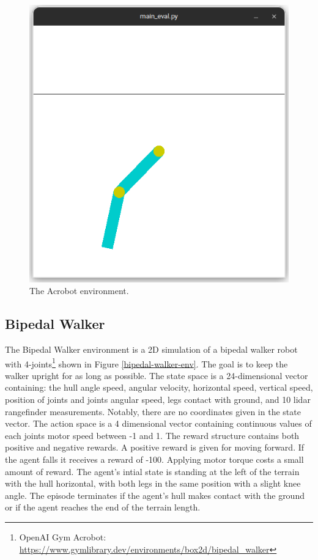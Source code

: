\begin{figure}[htbp]
    \centerline{\includegraphics[width=\columnwidth]{./img/acrobot-env.png}}
    \caption{The Acrobot environment.}
    \label{fig:acrobot-env}
\end{figure}

\subsection{Bipedal Walker}
The Bipedal Walker environment is a 2D simulation of a bipedal walker robot with
4-joints\footnote{OpenAI Gym Acrobot: \url{https://www.gymlibrary.dev/environments/box2d/bipedal_walker}}
shown in Figure \ref{bipedal-walker-env}. The goal is to keep the walker upright for as long as possible.
The state space is a 24-dimensional vector containing:
the hull angle speed, angular velocity, horizontal speed, vertical speed, position of joints and joints angular speed,
legs contact with ground, and 10 lidar rangefinder measurements. Notably, there are no coordinates given in the state vector.
The action space is a 4 dimensional vector containing continuous values of each joints motor speed between -1 and 1.
The reward structure contains both positive and negative rewards. A positive reward is given for moving forward. If the agent falls it receives a reward of -100.
Applying motor torque costs a small amount of reward.
The agent's intial state is standing at the left of the terrain with the hull horizontal, with both legs in the same position with a slight knee angle.
The episode terminates if the agent's hull makes contact with the ground or if the agent reaches the end of the terrain length.

